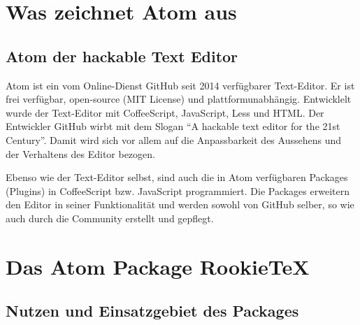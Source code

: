 \chapter{Was zeichnet Atom aus}
 \section{Atom der hackable Text Editor}
 Atom ist ein vom Online-Dienst GitHub seit 2014 verfügbarer Text-Editor. Er ist frei verfügbar, open-source (MIT License) und plattformunabhängig. Entwicklelt wurde der Text-Editor mit CoffeeScript, JavaScript, Less und HTML. Der Entwickler GitHub wirbt mit dem Slogan "`A hackable text editor for the 21st Century"'. Damit wird sich vor allem auf die Anpassbarkeit des Aussehens und der Verhaltens des Editor bezogen.

 Ebenso wie der Text-Editor selbst, sind auch die in Atom verfügbaren Packages (Plugins) in CoffeeScript bzw. JavaScript programmiert. Die Packages erweitern den Editor in seiner Funktionalität und werden sowohl von GitHub selber, so wie auch durch die Community erstellt und gepflegt.

\chapter{Das Atom Package RookieTeX}
\section{Nutzen und Einsatzgebiet des Packages}
